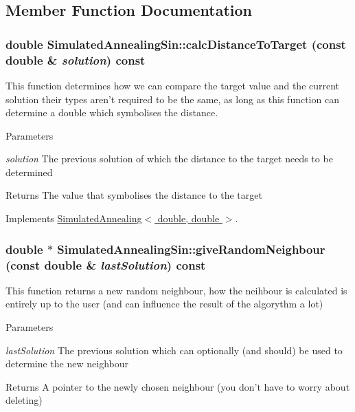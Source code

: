 \subsection{Member Function Documentation}
\hypertarget{class_simulated_annealing_sin_a064890c05ac35e04b71ce6a1405f1e36}{
\subsubsection[{calcDistanceToTarget}]{\setlength{\rightskip}{0pt plus 5cm}double SimulatedAnnealingSin::calcDistanceToTarget (const double \& {\em solution}) const}}
\label{class_simulated_annealing_sin_a064890c05ac35e04b71ce6a1405f1e36}
This function determines how we can compare the target value and the current solution their types aren't required to be the same, as long as this function can determine a double which symbolises the distance. 
\begin{DoxyParams}{Parameters}
\item[{\em solution}]The previous solution of which the distance to the target needs to be determined \end{DoxyParams}
\begin{DoxyReturn}{Returns}
The value that symbolises the distance to the target 
\end{DoxyReturn}


Implements \hyperlink{class_simulated_annealing_ac68b8a3c38d3095893498b9a7e292346}{SimulatedAnnealing$<$ double, double $>$}.\hypertarget{class_simulated_annealing_sin_acd5444d158d2877c3d95472cdb8b5297}{
\subsubsection[{giveRandomNeighbour}]{\setlength{\rightskip}{0pt plus 5cm}double $\ast$ SimulatedAnnealingSin::giveRandomNeighbour (const double \& {\em lastSolution}) const}}
\label{class_simulated_annealing_sin_acd5444d158d2877c3d95472cdb8b5297}
This function returns a new random neighbour, how the neihbour is calculated is entirely up to the user (and can influence the result of the algorythm a lot) 
\begin{DoxyParams}{Parameters}
\item[{\em lastSolution}]The previous solution which can optionally (and should) be used to determine the new neighbour \end{DoxyParams}
\begin{DoxyReturn}{Returns}
A pointer to the newly chosen neighbour (you don't have to worry about deleting) 
\end{DoxyReturn}



